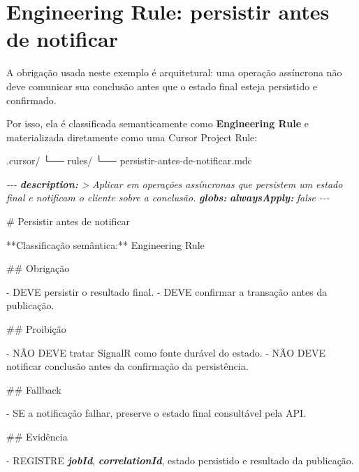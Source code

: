 \documentclass[
  10pt,
  a4paper,
  oneside]{book}
\newenvironment{Shaded}{}{}
\newcommand{\AnnotationTok}[1]{\textcolor[rgb]{0.38,0.63,0.69}{\textbf{\textit{#1}}}}
\newcommand{\CommentTok}[1]{\textcolor[rgb]{0.38,0.63,0.69}{\textit{#1}}}
\newcommand{\FunctionTok}[1]{\textcolor[rgb]{0.02,0.16,0.49}{#1}}
\newcommand{\InformationTok}[1]{\textcolor[rgb]{0.38,0.63,0.69}{\textbf{\textit{#1}}}}
\newcommand{\NormalTok}[1]{#1}
\newcommand{\SpecialStringTok}[1]{\textcolor[rgb]{0.73,0.40,0.53}{#1}}
\renewenvironment{Shaded}{\begin{snugshade}}{\end{snugshade}}%
\begin{document}
\hypertarget{engineering-rule-persistir-antes-de-notificar}{%
\section{Engineering Rule: persistir antes de
notificar}\label{engineering-rule-persistir-antes-de-notificar}}

A obrigação usada neste exemplo é arquitetural: uma operação assíncrona
não deve comunicar sua conclusão antes que o estado final esteja
persistido e confirmado.

Por isso, ela é classificada semanticamente como \textbf{Engineering
Rule} e materializada diretamente como uma Cursor Project Rule:

\begin{Shaded}
\begin{Highlighting}[]
\NormalTok{.cursor/}
\NormalTok{└── rules/}
\NormalTok{    └── persistir{-}antes{-}de{-}notificar.mdc}
\end{Highlighting}
\end{Shaded}

\begin{Shaded}
\begin{Highlighting}[]
\CommentTok{{-}{-}{-}}
\AnnotationTok{description:}\CommentTok{ \textgreater{}}
\CommentTok{  Aplicar em operações assíncronas que persistem um estado final}
\CommentTok{  e notificam o cliente sobre a conclusão.}
\AnnotationTok{globs:}
\AnnotationTok{alwaysApply:}\CommentTok{ false}
\CommentTok{{-}{-}{-}}

\FunctionTok{\# Persistir antes de notificar}

\NormalTok{**Classificação semântica:** Engineering Rule}

\FunctionTok{\#\# Obrigação}

\SpecialStringTok{{-} }\NormalTok{DEVE persistir o resultado final.}
\SpecialStringTok{{-} }\NormalTok{DEVE confirmar a transação antes da publicação.}

\FunctionTok{\#\# Proibição}

\SpecialStringTok{{-} }\NormalTok{NÃO DEVE tratar SignalR como fonte durável do estado.}
\SpecialStringTok{{-} }\NormalTok{NÃO DEVE notificar conclusão antes da confirmação da persistência.}

\FunctionTok{\#\# Fallback}

\SpecialStringTok{{-} }\NormalTok{SE a notificação falhar, preserve o estado final consultável pela API.}

\FunctionTok{\#\# Evidência}

\SpecialStringTok{{-} }\NormalTok{REGISTRE }\InformationTok{\textasciigrave{}jobId\textasciigrave{}}\NormalTok{, }\InformationTok{\textasciigrave{}correlationId\textasciigrave{}}\NormalTok{, estado persistido e resultado da publicação.}
\end{Highlighting}
\end{Shaded}
\end{document}
